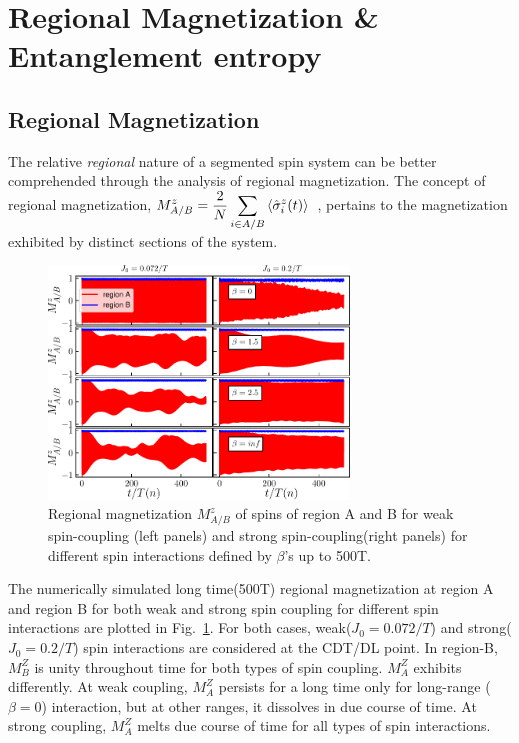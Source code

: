 \documentclass[%
nofootinbib,
reprint,
superscriptaddress,
amsmath,amssymb,showkeys,
aps,
prb,
]{revtex4-2}
\begin{document}
	\section{\label{sec:level4}Regional  Magnetization \& Entanglement entropy}
	
	\subsection{\label{sec:level42} Regional Magnetization}
	The relative \textit{regional} nature of a segmented spin system can be better comprehended through the analysis of regional magnetization. The concept of regional magnetization, $\displaystyle M^z_{A/B}=\frac{2}{N}\sum_{i\in{A/B}}\expval{\hat{\sigma}^z_i(t)}$~\cite{sakurai_phys_nodate}, pertains to the magnetization exhibited by distinct sections of the system.
	\begin{figure}
		\centering
		\includegraphics[width = 8cm]{clean_J_strong_MzAB_betas.pdf}
		\caption{Regional magnetization $M^z_{A/B}$ of spins of region A and B for weak spin-coupling (left panels) and strong spin-coupling(right panels) for different spin interactions defined by $\beta$'s up to 500T.}
		\label{Fig:regiogionalmag}
	\end{figure}
	The numerically simulated long time(500T) regional magnetization at region A and region B for both weak and strong spin coupling for different spin interactions are plotted in Fig.~\ref{Fig:regiogionalmag}. For both cases, weak($J_0=0.072/T$) and strong($J_0=0.2/T$) spin interactions are considered at the CDT/DL point. In region-B,  $M^Z_B$ is unity throughout time for both types of spin coupling. $M^Z_A$ exhibits differently. At weak coupling, $M^Z_A$ persists for a long time only for long-range ($\beta=0$) interaction, but at other ranges, it dissolves in due course of time. At strong coupling, $M^Z_A$ melts due course of time for all types of spin interactions.
	
\end{document}
